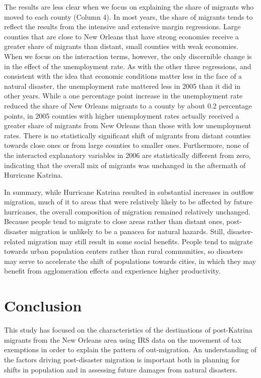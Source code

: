 \documentclass[]{article}
\begin{document}
The results are less clear when we focus on explaining the share of
migrants who moved to each county (Column 4). In most years, the share
of migrants tends to reflect the results from the intensive and
extensive margin regressions. Large counties that are close to New
Orleans that have strong economies receive a greater share of migrants
than distant, small counties with weak economies. When we focus on the
interaction terms, however, the only discernible change is in the effect
of the unemployment rate. As with the other three regressions, and
consistent with the idea that economic conditions matter less in the
face of a natural disaster, the unemployment rate mattered less in 2005
than it did in other years. While a one percentage point increase in the
unemployment rate reduced the share of New Orleans migrants to a county
by about 0.2 percentage points, in 2005 counties with higher
unemployment rates actually received a greater share of migrants from
New Orleans than those with low unemployment rates. There is no
statistically significant shift of migrants from distant counties
towards close ones or from large counties to smaller ones. Furthermore,
none of the interacted explanatory variables in 2006 are statistically
different from zero, indicating that the overall mix of migrants was
unchanged in the aftermath of Hurricane Katrina.

In summary, while Hurricane Katrina resulted in substantial increases in
outflow migration, much of it to areas that were relatively likely to be
affected by future hurricanes, the overall composition of migration
remained relatively unchanged. Because people tend to migrate to close
areas rather than distant ones, post-disaster migration is unlikely to
be a panacea for natural hazards. Still, disaster-related migration may
still result in some social benefits. People tend to migrate towards
urban population centers rather than rural communities, so disasters may
serve to accelerate the shift of populations towards cities, in which
they may benefit from agglomeration effects and experience higher
productivity.

\section{\texorpdfstring{Conclusion
\label{sec:conclusion}}{Conclusion }}\label{conclusion}

This study has focused on the characteristics of the destinations of
post-Katrina migrants from the New Orleans area using IRS data on the
movement of tax exemptions in order to explain the pattern of
out-migration. An understanding of the factors driving post-disaster
migration is important both in planning for shifts in population and in
assessing future damages from natural disasters.
\end{document}

